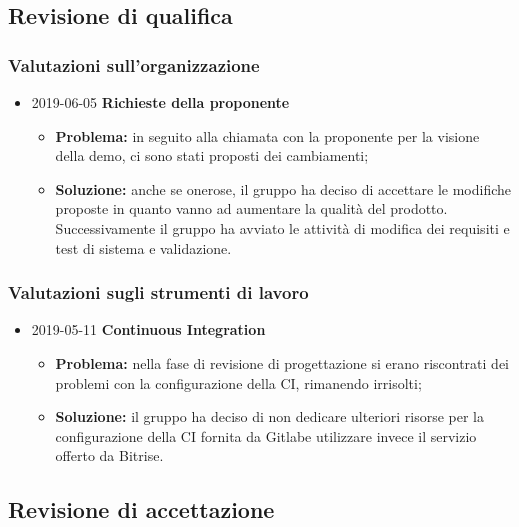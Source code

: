 \newpage
\subsection{Revisione di qualifica}
\subsubsection{Valutazioni sull'organizzazione}
\begin{itemize}	
		\item 2019-06-05 \textbf{Richieste della proponente} \\
		\begin{itemize}
			\item \textbf{Problema:} in seguito alla chiamata con la proponente per la visione della demo, ci sono stati proposti dei cambiamenti;
			\item \textbf{Soluzione:} anche se onerose, il gruppo ha deciso di accettare le modifiche proposte in quanto vanno ad aumentare la qualità del prodotto. Successivamente il gruppo ha avviato le attività di modifica dei requisiti e test di sistema e validazione.
		\end{itemize}
	
\end{itemize}
\subsubsection{Valutazioni sugli strumenti di lavoro}
\begin{itemize}
					
		\item 2019-05-11 \textbf{Continuous Integration} \\
		\begin{itemize}
			\item \textbf{Problema:} nella fase di revisione di progettazione si erano riscontrati dei problemi con la configurazione della CI, rimanendo irrisolti;
			\item \textbf{Soluzione:} il gruppo ha deciso di non dedicare ulteriori risorse per la configurazione della CI fornita da Gitlab\glosp e utilizzare invece il servizio offerto da Bitrise\glo.
		\end{itemize}
\end{itemize}

\newpage
\subsection{Revisione di accettazione}
